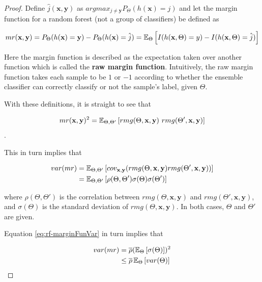 \begin{proof}
	Define $\hat{j}(\textbf{x},\textbf{y})$ as $arg max_{j\neq \textbf{y}} P_{\Theta}(h(\textbf{x}) = j)$ and let the margin function for a random forest (not a group of classifiers) be defined as
	
	\[\label{eq:rf-marginFunRf}
	mr(\textbf{x},\textbf{y}) =  P_{\Theta}(h(\textbf{x}) = \textbf{y}) - P_{\Theta}(h(\textbf{x}) = \hat{j})
	\\
	= \operatorname{\mathbb{E}}_{\Theta} \left[  I(h(\textbf{x},\Theta ) = y ) - I( h( \textbf{x},\Theta ) = \hat{j} )  \right]
	\]
	
	
	
	
	Here the margin function is described as the expectation taken over another function which is called the \textbf{raw margin function}\label{eq:rf-rawMarginFun}. Intuitively, the raw margin function takes each sample to be $1$ or $-1$ according to whether the ensemble classifier can correctly classify or not the sample's label, given $\Theta$.
	
	With these definitions, it is straight to see that
	
	\[
	mr( \textbf{x},\textbf{y} )^2 = \Expect_{\Theta, \Theta'} \left[ rmg( \Theta,\textbf{x},\textbf{y} ) \ rmg(\Theta',\textbf{x},\textbf{y} )  \right] 
	\].
	
	This in turn implies that
	
	\[\label{eq:rf-marginFunVar}
	\begin{split}
	var(mr) & =  \operatorname{\mathbb{E}}_{\Theta, \Theta'}
	\left[
	cov_{\textbf{x},\textbf{y}}
	(rmg(\Theta,\textbf{x},\textbf{y} )rmg(\Theta',\textbf{x},\textbf{y} ))
	\right] \\
	& =  \operatorname{\mathbb{E}}_{\Theta, \Theta'}
	\left[
	\rho(\Theta, \Theta')\sigma(\Theta)\sigma(\Theta')
	\right]
	\end{split}
	\]
	
	where $ \rho(\Theta, \Theta')$ is the correlation between $rmg(\Theta,\textbf{x},\textbf{y})$ and $rmg(\Theta',\textbf{x},\textbf{y})$, and $\sigma(\Theta)$ is the standard deviation of $rmg(\Theta,\textbf{x},\textbf{y})$. In both cases, $\Theta$ and $\Theta'$ are given.%
	
	Equation \ref{eq:rf-marginFunVar} in turn implies that
	
	\[\label{eq:rf-varianceBound}
	\begin{split}
	var(mr) & =  \overline{\rho} (\operatorname{\mathbb{E}}_{\Theta}\left[ \sigma(\Theta)\right] )^2 \\
	& \leq  \overline{\rho} \operatorname{\mathbb{E}}_{\Theta} \left[ var(\Theta) \right]
	\end{split}
	\]
	

\end{proof}
